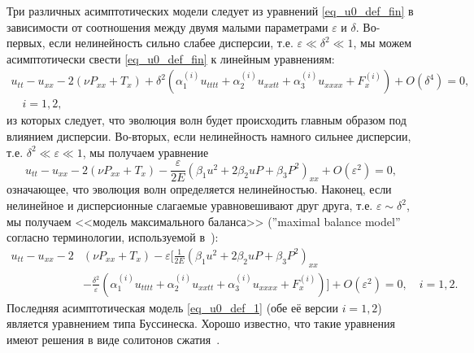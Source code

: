 \documentclass[12pt, a4paper]{report}
\begin{document}
Три различных асимптотических модели следует из уравнений \eqref{eq_u0_def_fin} в зависимости от соотношения между двумя малыми параметрами $\varepsilon$ и $\delta$. Во-первых, если нелинейность сильно слабее дисперсии, т.е. $ \varepsilon\ll\delta^2\ll1 $, мы можем асимптотически свести \eqref{eq_u0_def_fin} к линейным уравнениям:
\begin{equation}\label{eq_u0_def_3}
\begin{split}
u_{tt} - u_{xx} - 2\left(\nu P_{xx} + T_x\right) + \delta^2 \left(\alpha_1^{(i)} u_{tttt} + \alpha_2^{(i)} u_{xxtt} + \alpha_3^{(i)} u_{xxxx} + F^{(i)}_x \right) + O(\delta^4) = 0, \\
\quad i = 1,2,
\end{split}
\end{equation}
из которых следует, что эволюция волн будет происходить главным образом под влиянием дисперсии.
Во-вторых, если нелинейность намного сильнее дисперсии, т.е. $ \delta^2\ll\varepsilon\ll1 $, мы получаем уравнение
\begin{equation}\label{eq_u0_def_2}
u_{tt} - u_{xx} - 2\left(\nu P_{xx} + T_x\right) - \frac{\varepsilon}{2 E} \left(\beta_1 u^2 + 2 \beta_2 u P + \beta_3 P^2\right)_{xx} + O(\varepsilon^2) = 0,
\end{equation}
означающее, что эволюция волн определяется нелинейностью.
Наконец, если нелинейное и дисперсионные слагаемые уравновешивают друг друга, т.е. $ \varepsilon \sim \delta^2 $, мы получаем <<модель максимального баланса>> (''maximal balance model'' согласно терминологии, используемой в~\cite{Ablowitz2011}):
\begin{equation}\label{eq_u0_def_1}
\begin{split}
u_{tt} - u_{xx} - 2&\left(\nu P_{xx} + T_x\right) - \varepsilon \bigg[\frac{1}{2E} \left(\beta_1 u^2 + 2 \beta_2 u P + \beta_3 P^2\right)_{xx}\\
& - \frac{\delta^2}{\varepsilon} \left(\alpha_1^{(i)} u_{tttt} + \alpha_2^{(i)} u_{xxtt} + \alpha_3^{(i)} u_{xxxx} + F^{(i)}_x \right)\bigg] + O(\varepsilon^2) = 0, \quad i = 1,2.
\end{split}
\end{equation}
Последняя асимптотическая модель \eqref{eq_u0_def_1} (обе её версии $i = 1,2$) является уравнением типа Буссинеска. Хорошо известно, что такие уравнения имеют решения в виде солитонов сжатия~\cite{S_book}.
\end{document}
